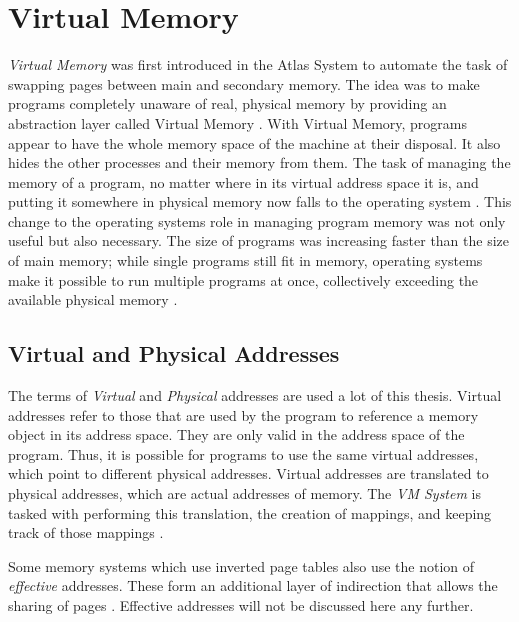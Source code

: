 \section{Virtual Memory}
\textit{Virtual Memory} was first introduced in the Atlas System \cite{fotheringham1961dynamic} to
automate the task of swapping pages between main and secondary memory.
The idea was to make programs completely unaware of real, physical memory by providing
an abstraction layer called Virtual Memory \cite{denning1996virtual}.
With Virtual Memory, programs appear to have the whole memory space of the machine at their disposal. It also
hides the other processes and their memory from them.
The task of managing the memory of a program, no matter where in its virtual address space it is, and putting it somewhere
in physical memory now falls to the operating system \cite{denning1970virtual}.
This change to the operating systems role in managing program memory was not only useful but also necessary. The size of programs was increasing faster than the size of main
memory; while single programs
still fit in memory, operating systems make it possible to run multiple programs at once, collectively exceeding
the available physical memory \cite{tanenbaumOS}.

\subsection{Virtual and Physical Addresses}
The terms of \textit{Virtual} and \textit{Physical} addresses are used a lot of this thesis.
Virtual addresses refer to those that are used by the program to reference a memory object in its address
space. They are only valid in the address space of the program. Thus, it is possible for programs to use the same
virtual addresses, which point to different physical addresses.
Virtual addresses are translated to physical addresses, which are actual addresses of memory. The \textit{VM System} is tasked with performing this translation, the creation of mappings,
and keeping track of those mappings \cite{denning1996virtual}.

Some memory systems which use inverted page tables also use the notion of \textit{effective} addresses.
These form an additional layer of indirection that allows the sharing of pages \cite{jacob1998virtualissues}.
Effective addresses will not be discussed here any further.


